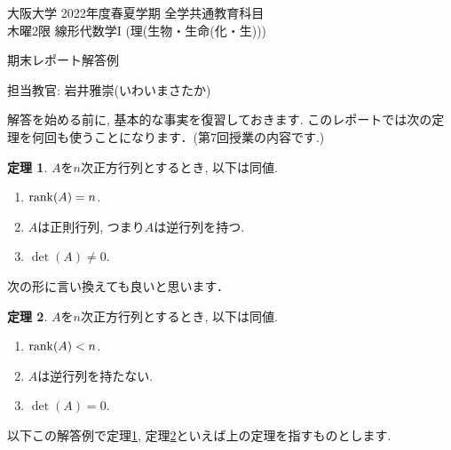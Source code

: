 \documentclass[dvipdfmx,a4paper,11pt]{article}
\theoremstyle{definition}
\newtheorem{thm}{定理}
\begin{document}
\newpage

\begin{center}
{ \large 大阪大学 2022年度春夏学期 全学共通教育科目 \\ 木曜2限 線形代数学I (理(生物・生命(化・生)))} \\
\vspace{5pt}

{\LARGE 期末レポート解答例 } \\
\vspace{5pt}

\end{center}

\begin{flushright}
 担当教官: 岩井雅崇(いわいまさたか) 
\end{flushright} 

解答を始める前に, 基本的な事実を復習しておきます.
 このレポートでは次の定理を何回も使うことになります．(第7回授業の内容です.)
 
 \begin{tcolorbox}[
    colback = white,
    colframe = green!35!black,
    fonttitle = \bfseries,
    breakable = true]
    \begin{thm}
    \label{determinant}
    $A$を$n$次正方行列とするとき, 以下は同値.
\begin{enumerate}
\item $\rank (A) =n$.
\item $A$は正則行列, つまり$A$は逆行列を持つ.
\item $\det(A)\neq 0$.
\end{enumerate}
  \end{thm}
 \end{tcolorbox}
 
次の形に言い換えても良いと思います．
  \begin{tcolorbox}[
    colback = white,
    colframe = green!35!black,
    fonttitle = \bfseries,
    breakable = true]
    \begin{thm}
    \label{determinant_2}
    $A$を$n$次正方行列とするとき, 以下は同値.
\begin{enumerate}
\item $\rank (A) < n$.
\item $A$は逆行列を持たない.
\item $\det(A)= 0$.
\end{enumerate}
  \end{thm}
 \end{tcolorbox}
以下この解答例で定理\ref{determinant}, 定理\ref{determinant_2}といえば上の定理を指すものとします.
  \vspace{22pt}
 
\end{document}
